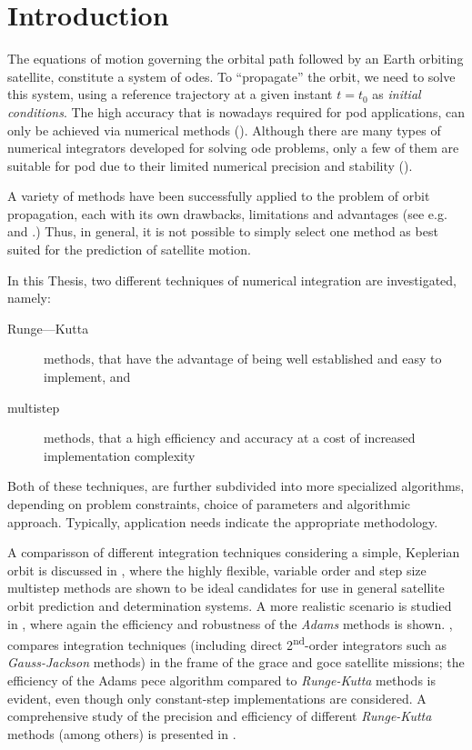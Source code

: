 \section{Introduction}\label{sec:integration-introduction}

The equations of motion governing the orbital path followed by an Earth orbiting 
satellite, constitute a system of \glspl{ode}. To ``propagate'' the orbit, we need 
to solve this system, using a reference trajectory at a given instant $t=t_0$ as 
\emph{initial conditions}. The high accuracy that is nowadays required for \gls{pod} 
applications, can only be achieved via numerical methods (\cite{Montenbruck2000}).
Although there are many types of numerical integrators developed for solving \gls{ode} 
problems, only a few of them are suitable for \gls{pod} due to their limited 
numerical precision and stability (\cite{Yufeng2020}).

A variety of methods have been successfully applied to the problem of orbit 
propagation, each with its own drawbacks, limitations and advantages (see e.g.
\cite{Somodi2011} and \cite{Atallah2020}.)
Thus, in general, it is not possible to simply select one method as best 
suited for the prediction of satellite motion.

In this Thesis, two different techniques of numerical integration are investigated, 
namely:
\begin{description}
    \item[Runge—Kutta] methods, that have the advantage of being well established 
      and easy to implement, and
    \item[multistep] methods, that a high efficiency and accuracy at a cost of 
      increased implementation complexity
\end{description}
Both of these techniques, are further subdivided into more specialized algorithms, 
depending on problem constraints, choice of parameters and algorithmic approach. 
Typically, application needs indicate the appropriate methodology.

A comparisson of different integration techniques considering a simple, Keplerian
orbit is discussed in \cite{Montenbruck1992}, where the highly flexible, variable
order and step size multistep methods are shown to be ideal candidates for use 
in general satellite orbit prediction and determination systems. A more realistic 
scenario is studied in \cite{Somodi2011}, where again the efficiency and robustness 
of the \emph{Adams} methods is shown. 
\cite{Papanikolaou2016}, compares integration techniques (including direct 
2\textsuperscript{nd}-order integrators such as \emph{Gauss-Jackson} methods) 
in the frame of the \gls{grace} and \gls{goce} satellite missions; the efficiency 
of the Adams \gls{pece} algorithm compared to \emph{Runge-Kutta} methods is evident, 
even though only constant-step implementations are considered. A comprehensive 
study of the precision and efficiency of different \emph{Runge-Kutta} methods 
(among others) is presented in \cite{Atallah2020}.

